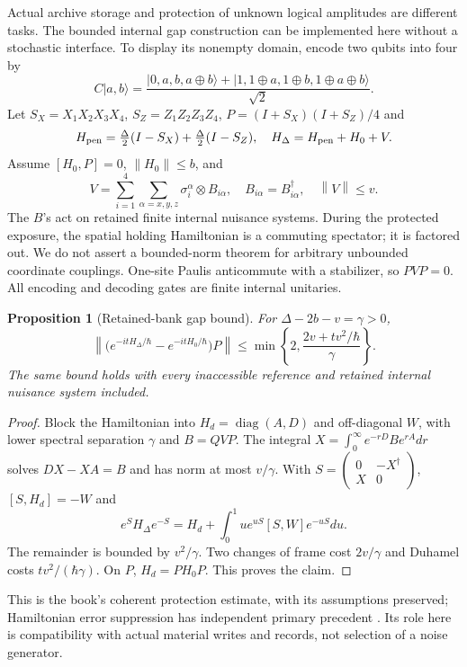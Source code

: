 \documentclass[11pt,oneside,openany]{book}
\newtheorem{proposition}[theorem]{Proposition}
\theoremstyle{definition}
\theoremstyle{remark}\newtheorem{remark}[theorem]{Remark}
\providecommand{\ket}[1]{\lvert#1\rangle}
\providecommand{\norm}[1]{\left\lVert#1\right\rVert}
\begin{document}
Actual archive storage and protection of unknown logical amplitudes are different tasks. The bounded internal gap construction can be implemented here without a stochastic interface. To display its nonempty domain, encode two qubits into four by
\[
 C\ket{a,b}=\frac{\ket{0,a,b,a\oplus b}+\ket{1,1\oplus a,1\oplus b,1\oplus a\oplus b}}{\sqrt2}.
\]
Let $S_X=X_1X_2X_3X_4$, $S_Z=Z_1Z_2Z_3Z_4$, $P=(I+S_X)(I+S_Z)/4$ and
\[
 H_{\rm pen}=\tfrac\Delta2(I-S_X)+\tfrac\Delta2(I-S_Z),\quad
 H_\Delta=H_{\rm pen}+H_0+V.
\]
Assume $[H_0,P]=0$, $\norm{H_0}\le b$, and
\[
 V=\sum_{i=1}^4\sum_{\alpha=x,y,z}\sigma_i^\alpha\otimes B_{i\alpha},
 \quad B_{i\alpha}=B_{i\alpha}^\dagger,\quad\norm V\le v.
\]
The $B$'s act on retained finite internal nuisance systems. During the protected exposure, the spatial holding Hamiltonian is a commuting spectator; it is factored out. We do not assert a bounded-norm theorem for arbitrary unbounded coordinate couplings. One-site Paulis anticommute with a stabilizer, so $PVP=0$. All encoding and decoding gates are finite internal unitaries.

\begin{proposition}[Retained-bank gap bound]\label{mc:prop:gap}
For $\Delta-2b-v=\gamma>0$,
\begin{equation}\label{mc:eq:gap}
 \norm{\bigl(e^{-itH_\Delta/\hbar}-e^{-itH_0/\hbar}\bigr)P}
 \le\min\left\{2,\frac{2v+tv^2/\hbar}{\gamma}\right\}.
\end{equation}
The same bound holds with every inaccessible reference and retained internal nuisance system included.
\end{proposition}
\begin{proof}
Block the Hamiltonian into $H_d=\operatorname{diag}(A,D)$ and off-diagonal $W$, with lower spectral separation $\gamma$ and $B=QVP$. The integral $X=\int_0^\infty e^{-rD}Be^{rA}dr$ solves $DX-XA=B$ and has norm at most $v/\gamma$. With $S=\left(\begin{smallmatrix}0&-X^\dagger\\X&0\end{smallmatrix}\right)$, $[S,H_d]=-W$ and
\[
 e^SH_\Delta e^{-S}=H_d+\int_0^1u e^{uS}[S,W]e^{-uS}du.
\]
The remainder is bounded by $v^2/\gamma$. Two changes of frame cost $2v/\gamma$ and Duhamel costs $tv^2/(\hbar\gamma)$. On $P$, $H_d=PH_0P$. This proves the claim.
\end{proof}
This is the book's coherent protection estimate, with its assumptions preserved; Hamiltonian error suppression has independent primary precedent \cite{MarvianLidar}. Its role here is compatibility with actual material writes and records, not selection of a noise generator.
\end{document}
